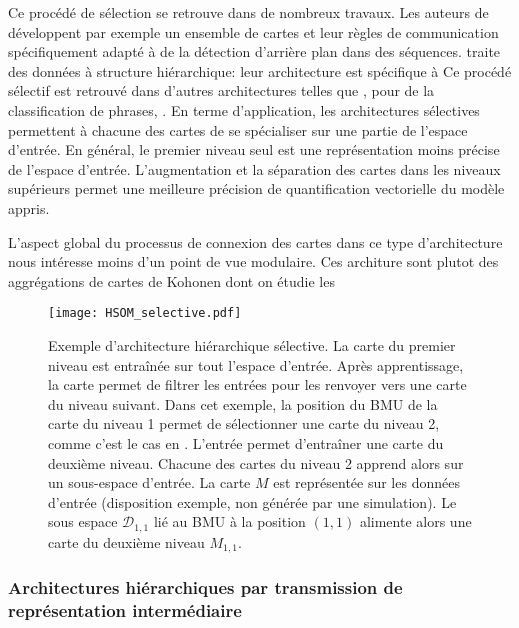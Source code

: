 \documentclass[../main]{subfiles}
\begin{document}
Ce procédé de sélection se retrouve dans de nombreux travaux. 
Les auteurs de \cite{zhao_stacked_2015} développent par exemple un ensemble de cartes et leur règles de communication spécifiquement adapté à de la détection d'arrière plan dans des séquences.
\cite{miikkulainen_script_1992} traite des données à structure hiérarchique: leur architecture est spécifique à
Ce procédé sélectif est retrouvé dans d'autres architectures telles que \cite{suganthan_pattern_2001}, \cite{miikkulainen_script_1992} pour de la classification de phrases, \cite{dittenbach_growing_2000,ordonez_hierarchical_2010}.
En terme d'application, les architectures sélectives permettent à chacune des cartes de se spécialiser sur une partie de l'espace d'entrée. 
En général, le premier niveau seul est une représentation moins précise de l'espace d'entrée. L'augmentation et la séparation des cartes dans les niveaux supérieurs permet une meilleure précision de quantification vectorielle du modèle appris.


L'aspect global du processus de connexion des cartes dans ce type d'architecture nous intéresse moins d'un point de vue modulaire. Ces architure sont plutot des aggrégations de cartes de Kohonen dont on étudie les


\begin{figure}
    \texttt{[image: HSOM\_selective.pdf]}
    \caption{Exemple d'architecture hiérarchique sélective. La carte du premier niveau est entraînée sur tout l'espace d'entrée. Après apprentissage, la carte permet de filtrer les entrées pour les renvoyer vers une carte du niveau suivant. Dans cet exemple, la position du BMU de la carte du niveau 1 permet de sélectionner une carte du niveau 2, comme c'est le cas en \cite{barbalho_hierarchical_2001}. 
    L'entrée permet d'entraîner une carte du deuxième niveau. Chacune des cartes du niveau 2 apprend alors sur un sous-espace d'entrée. La carte $M$ est représentée sur les données d'entrée (disposition exemple, non générée par une simulation). Le sous espace $\mathcal{D}_{1,1}$ lié au BMU à la position $(1,1)$ alimente alors une carte du deuxième niveau $M_{1,1}$.
    \label{fig:hsom_selective}}
\end{figure}


\subsubsection{Architectures hiérarchiques par transmission de représentation intermédiaire}
\end{document}
